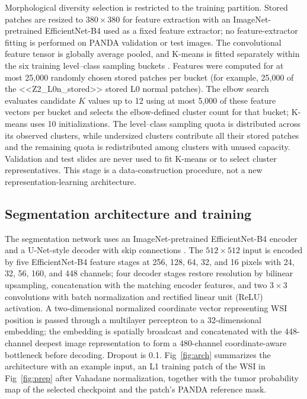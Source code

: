 \documentclass[10pt,letterpaper]{article}
\begin{document}
Morphological diversity selection is restricted to the training partition. Stored patches are resized to $380\times380$ for feature extraction with an ImageNet-pretrained EfficientNet-B4 used as a fixed feature extractor; no feature-extractor fitting is performed on PANDA validation or test images. The convolutional feature tensor is globally average pooled, and K-means is fitted separately within the six training level--class sampling buckets \cite{bib34}. Features were computed for at most 25,000 randomly chosen stored patches per bucket (for example, 25,000 of the <<Z2_L0n_stored>> stored L0 normal patches). The elbow search evaluates candidate $K$ values up to 12 using at most 5,000 of these feature vectors per bucket and selects the elbow-defined cluster count for that bucket; K-means uses 10 initializations. The level--class sampling quota is distributed across its observed clusters, while undersized clusters contribute all their stored patches and the remaining quota is redistributed among clusters with unused capacity. Validation and test slides are never used to fit K-means or to select cluster representatives. This stage is a data-construction procedure, not a new representation-learning architecture.

\subsection*{Segmentation architecture and training}
The segmentation network uses an ImageNet-pretrained EfficientNet-B4 encoder and a U-Net-style decoder with skip connections \cite{bib29,bib30}. The $512\times512$ input is encoded by five EfficientNet-B4 feature stages at 256, 128, 64, 32, and 16 pixels with 24, 32, 56, 160, and 448 channels; four decoder stages restore resolution by bilinear upsampling, concatenation with the matching encoder features, and two $3\times3$ convolutions with batch normalization and rectified linear unit (ReLU) activation. A two-dimensional normalized coordinate vector representing WSI position is passed through a multilayer perceptron to a 32-dimensional embedding; the embedding is spatially broadcast and concatenated with the 448-channel deepest image representation to form a 480-channel coordinate-aware bottleneck before decoding. Dropout is 0.1. Fig~\ref{fig:arch} summarizes the architecture with an example input, an L1 training patch of the WSI in Fig~\ref{fig:prep} after Vahadane normalization, together with the tumor probability map of the selected checkpoint and the patch's PANDA reference mask.
\end{document}
